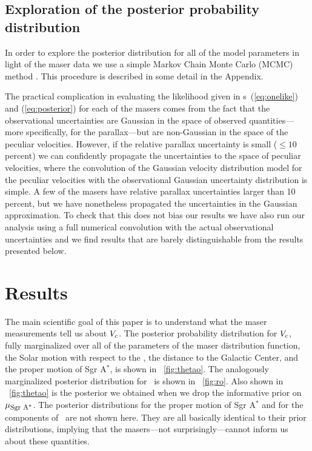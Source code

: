 \subsection{Exploration of the posterior probability distribution}

In order to explore the posterior distribution for all of the model
parameters in light of the maser data we use a simple Markov Chain
Monte Carlo (MCMC) method \citep{mackay}. This procedure is described
in some detail in the Appendix.

The practical complication in evaluating the likelihood given in
\eqnname s~(\ref{eq:onelike}) and (\ref{eq:posterior}) for each of the
masers comes from the fact that the observational uncertainties are
Gaussian in the space of observed quantities---more specifically, for
the parallax---but are non-Gaussian in the space of the peculiar
velocities. However, if the relative parallax uncertainty is small
($\leq 10$\,percent) we can confidently propagate the uncertainties to
the space of peculiar velocities, where the convolution of the
Gaussian velocity distribution model for the peculiar velocities with
the observational Gaussian uncertainty distribution is simple. A few
of the masers have relative parallax uncertainties larger than
10\,percent, but we have nonetheless propagated the uncertainties in
the Gaussian approximation. To check that this does not bias our
results we have also run our analysis using a full numerical
convolution with the actual observational uncertainties and we find
results that are barely distinguishable from the results presented
below.


\section{Results}\label{sec:results}

The main scientific goal of this paper is to understand what the maser
measurements tell us about $V_c$. The posterior probability
distribution for $V_c$, fully marginalized over all of the parameters
of the maser distribution function, the Solar motion with respect to
the \lsr, the distance to the Galactic Center, and the proper motion
of Sgr A$^*$, is shown in \figurename~\ref{fig:thetao}. The
analogously marginalized posterior distribution for \Ro\ is shown in
\figurename~\ref{fig:ro}. Also shown in \figurename~\ref{fig:thetao}
is the posterior we obtained when we drop the informative prior on
$\mu_{\mbox{{\footnotesize Sgr A$^*$}}}$. The posterior distributions for the proper motion of Sgr
A$^*$ and for the components of \vsunlsr\ are not shown here. They are
all basically identical to their prior distributions, implying that
the masers---not surprisingly---cannot inform us about these
quantities.

